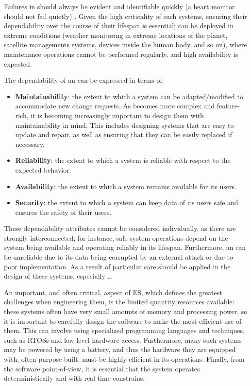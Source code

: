 Failures in \ess should always be evident and identifiable quickly (a heart monitor should not fail quietly) \cite{MakingEmbeddedSystems}. Given the high criticality of such systems, ensuring their dependability over the course of their lifespan is essential; \ess can be deployed in extreme conditions (\ie weather monitoring in extreme locations of the planet, satellite managements systems, devices inside the human body, and so on), where maintenance operations cannot be performed regularly, and high availability is expected. 

The dependability of an \es can be expressed in terms of:
\begin{itemize}
    \item \textbf{Maintainability}: the extent to which a system can be adapted/modified to accommodate new change requests. As \ess becomes more complex and feature-rich, it is becoming increasingly important to design them with maintainability in mind. This includes designing systems that are easy to update and repair, as well as ensuring that they can be easily replaced if necessary.
    \item \textbf{Reliability}: the extent to which a system is reliable with respect to the expected behavior.
    \item \textbf{Availability}: the extent to which a system remains available for its users.
    \item \textbf{Security}: the extent to which a system can keep data of its users safe and ensures the safety of their users.
\end{itemize}

These dependability attributes cannot be considered individually, as there are strongly interconnected; for instance, safe system operations depend on the system being available and operating reliably in its lifespan. Furthermore, an \es can be unreliable due to its data being corrupted by an external attack or due to poor implementation. As a result of particular care should be applied in the design of these systems, especially \dots 



An important, and often critical, aspect of ES, which defines the greatest challenges when engineering them, is the limited quantity resources available: these systems often have very small amounts of memory and processing power, so it is important to carefully design the software to make the most efficient use of them. This can involve using specialized programming languages and techniques, such as RTOSs and low-level hardware access. Furthermore, many such systems may be powered by using a battery, and thus the hardware they are equipped with, often purpose built, must be highly efficient in its operations. Finally, from the software point-of-view, it is essential that the system operates deterministically and with real-time constrains.

